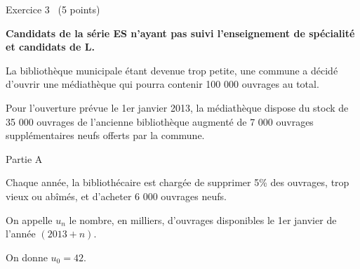 
%
\begin{h2}Exercice 3  (5 points)\end{h2}
\par
\textbf{Candidats de la série ES n'ayant pas suivi l'enseignement de spécialité et candidats de L.}
\par
La bibliothèque municipale étant devenue trop petite, une commune a décidé d'ouvrir une médiathèque qui pourra contenir 100 000 ouvrages au total.
\par
Pour l'ouverture prévue le 1er janvier 2013, la médiathèque dispose du stock de 35 000 ouvrages de l'ancienne bibliothèque augmenté de 7 000 ouvrages supplémentaires neufs offerts par la commune.
\begin{h3}Partie A\end{h3}
Chaque année, la bibliothécaire est chargée de supprimer 5\% des ouvrages, trop vieux ou abîmés, et d'acheter 6 000 ouvrages neufs.
\par
On appelle $u_{n}$ le nombre, en milliers, d'ouvrages disponibles le 1er  janvier de l'année $\left(2013+n\right)$.
\par
On donne $u_{0}=42$.
